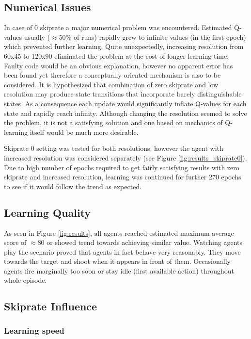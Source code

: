 \documentclass[english,bachelor,a4paper,twoside]{ppfcmthesis}
\begin{document}
	\subsection{Numerical Issues}
		In case of 0 skiprate a major numerical problem was encountered. Estimated Q-values usually ($\approx$50\% of runs) rapidly grew to infinite values (in the first epoch) which prevented further learning. Quite unexpectedly, increasing resolution from 60x45 to 120x90 eliminated the problem at the cost of longer learning time. Faulty code would be an obvious explanation, however no apparent error has been found yet therefore a conceptually oriented mechanism is also to be considered. It is hypothesized that combination of zero skiprate and low resolution may produce state transitions that incorporate barely distinguishable states. As a consequence each update would significantly inflate Q-values for each state and rapidly reach infinity. Although changing the resolution seemed to solve the problem, it is not a satisfying solution and one based on mechanics of Q-learning itself would be much more desirable.

		Skiprate 0 setting was tested for both resolutions, however the agent with increased resolution was considered separately (see Figure \ref{fig:results_skiprate0}). Due to high number of epochs required to get fairly satisfying results with zero skiprate and increased resolution, learning was continued for further 270 epochs to see if it would follow the trend as expected.

	\subsection{Learning Quality}
		As seen in Figure \ref{fig:results}, all agents reached estimated maximum average score of $\approx$80 or showed trend towards achieving similar value. Watching agents play the scenario proved that agents in fact behave very reasonably. They move towards the target and shoot when it appears in front of them. Occasionally agents fire marginally too soon or stay idle (first available action) throughout whole episode. 
		
	\subsection{Skiprate Influence}
			
			
		\subsubsection*{Learning speed} 
\end{document}
